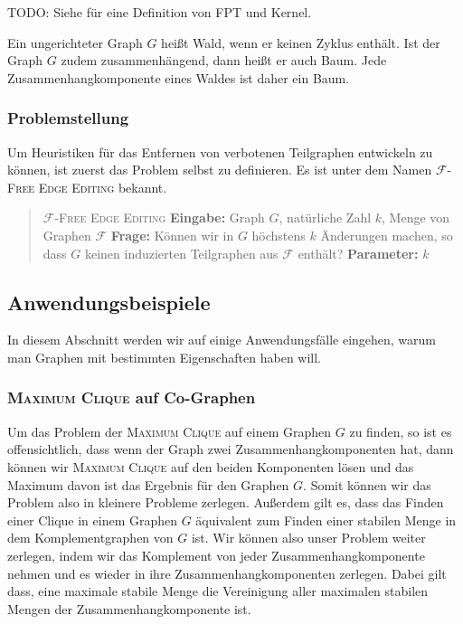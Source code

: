 \documentclass[12pt,a4paper,onecolumn,oneside,titlepage]{article}
\newcommand\cursive[1]{\ensuremath{\mathcal{#1}}}
\begin{document}
TODO: Siehe \cite{Cai96} für eine Definition von FPT und Kernel.

Ein ungerichteter Graph $G$ heißt Wald, wenn er keinen Zyklus enthält. Ist der Graph $G$ zudem zusammenhängend, dann heißt er auch Baum. Jede Zusammenhangkomponente eines Waldes ist daher ein Baum.

\subsubsection{Problemstellung}
\label{sec:problem}
Um Heuristiken für das Entfernen von verbotenen Teilgraphen entwickeln zu können, ist zuerst das Problem selbst zu definieren. Es ist unter dem Namen \textsc{\cursive{F}-Free Edge Editing} bekannt.
\begin{quote}
  \textsc{\cursive{F}-Free Edge Editing}\newline
  \textbf{Eingabe:} Graph $G$, natürliche Zahl $k$, Menge von Graphen \cursive{F}\newline
  \textbf{Frage:} Können wir in $G$ höchstens $k$ Änderungen machen, so dass $G$ keinen induzierten Teilgraphen aus \cursive{F} enthält?\newline
  \textbf{Parameter:} $k$
\end{quote}

\subsection{Anwendungsbeispiele}
\label{sec:examples}
In diesem Abschnitt werden wir auf einige Anwendungsfälle eingehen, warum man Graphen mit bestimmten Eigenschaften haben will.
\subsubsection{\textsc{Maximum Clique} auf Co-Graphen}
Um das Problem der \textsc{Maximum Clique} auf einem Graphen $G$ zu finden, so ist es offensichtlich, dass wenn der Graph zwei Zusammenhangkomponenten hat, dann können wir \textsc{Maximum Clique} auf den beiden Komponenten lösen und das Maximum davon ist das Ergebnis für den Graphen $G$. Somit können wir das Problem also in kleinere Probleme zerlegen.
Außerdem gilt es, dass das Finden einer Clique in einem Graphen $G$ äquivalent zum Finden einer stabilen Menge in dem Komplementgraphen  von $G$ ist.
Wir können also unser Problem weiter zerlegen, indem wir das Komplement von jeder Zusammenhangkomponente nehmen und es wieder in ihre Zusammenhangkomponenten zerlegen. Dabei gilt dass, eine maximale stabile Menge die Vereinigung aller maximalen stabilen Mengen der Zusammenhangkomponente ist.
\end{document}

